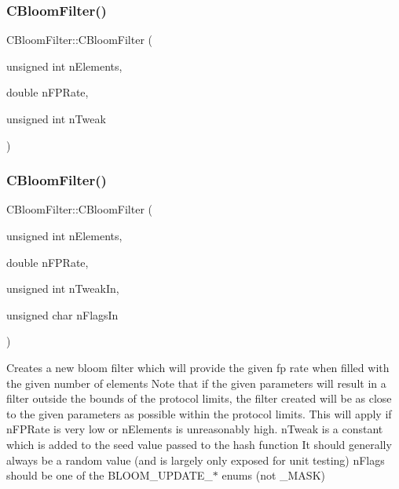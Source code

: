 \subsubsection{\texorpdfstring{C\+Bloom\+Filter()}{CBloomFilter()}\hspace{0.1cm}{\footnotesize\ttfamily [1/3]}}
{\footnotesize\ttfamily C\+Bloom\+Filter\+::\+C\+Bloom\+Filter (\begin{DoxyParamCaption}\item[{unsigned int}]{n\+Elements,  }\item[{double}]{n\+F\+P\+Rate,  }\item[{unsigned int}]{n\+Tweak }\end{DoxyParamCaption})\hspace{0.3cm}{\ttfamily [private]}}

\mbox{\label{class_c_bloom_filter_a6395cfcb278ed9cf4ae873549c996f83}} 
\subsubsection{\texorpdfstring{C\+Bloom\+Filter()}{CBloomFilter()}\hspace{0.1cm}{\footnotesize\ttfamily [2/3]}}
{\footnotesize\ttfamily C\+Bloom\+Filter\+::\+C\+Bloom\+Filter (\begin{DoxyParamCaption}\item[{unsigned int}]{n\+Elements,  }\item[{double}]{n\+F\+P\+Rate,  }\item[{unsigned int}]{n\+Tweak\+In,  }\item[{unsigned char}]{n\+Flags\+In }\end{DoxyParamCaption})}

Creates a new bloom filter which will provide the given fp rate when filled with the given number of elements Note that if the given parameters will result in a filter outside the bounds of the protocol limits, the filter created will be as close to the given parameters as possible within the protocol limits. This will apply if n\+F\+P\+Rate is very low or n\+Elements is unreasonably high. n\+Tweak is a constant which is added to the seed value passed to the hash function It should generally always be a random value (and is largely only exposed for unit testing) n\+Flags should be one of the B\+L\+O\+O\+M\+\_\+\+U\+P\+D\+A\+T\+E\+\_\+$\ast$ enums (not \+\_\+\+M\+A\+SK)

